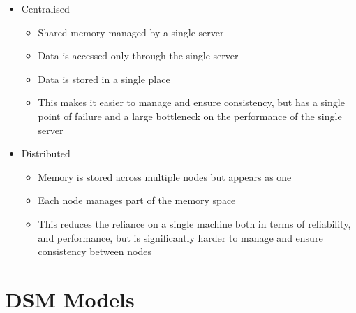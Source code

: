 \begin{itemize}
  \item Centralised
  \begin{itemize}
    \item Shared memory managed by a single server
    \item Data is accessed only through the single server
    \item Data is stored in a single place
    \item This makes it easier to manage and ensure consistency, but has a single point of failure and a large bottleneck on the performance of the single server
  \end{itemize}
  \item Distributed
  \begin{itemize}
    \item Memory is stored across multiple nodes but appears as one
    \item Each node manages part of the memory space
    \item This reduces the reliance on a single machine both in terms of reliability, and performance, but is significantly harder to manage and ensure consistency between nodes
  \end{itemize}
\end{itemize}

\section*{DSM Models}

